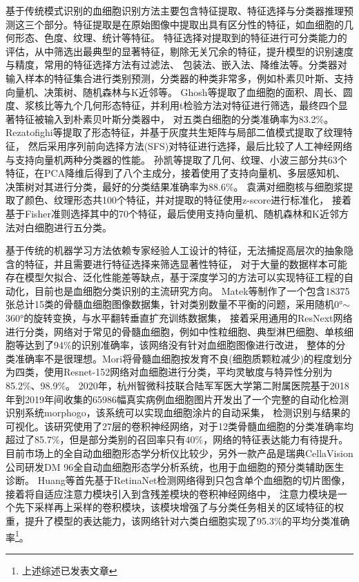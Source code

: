 基于传统模式识别\cite{jain2000statistical}的血细胞识别方法主要包含特征提取、特征选择与分类器推理预测这三个部分。特征提取是在原始图像中提取出具有区分性的特征，如血细胞的几何形态、色度、纹理、统计等特征。
特征选择对提取到的特征进行可分类能力的评估，从中筛选出最典型的显著特征，剔除无关冗余的特征，提升模型的识别速度与精度，常用的特征选择方法有过滤法、
包装法、嵌入法、降维法等。分类器对输入样本的特征集合进行类别预测，分类器的种类非常多，例如朴素贝叶斯、支持向量机、决策树、随机森林与K近邻等。
Ghosh\cite{ghosh2010statistical}等提取了血细胞的面积、周长、圆度、浆核比等九个几何形态特征，并利用t检验方法对特征进行筛选，最终四个显著特征被输入到朴素贝叶斯分类器中，
对五类白细胞的分类准确率为83.2\%。Rezatofighi\cite{2011Automatic}等提取了形态特征，并基于灰度共生矩阵与局部二值模式提取了纹理特征，
然后采用序列前向选择方法(SFS)对特征进行选择，最后比较了人工神经网络与支持向量机两种分类器的性能。
孙凯\cite{sunkai2020}等提取了几何、纹理、小波三部分共63个特征，在PCA降维后得到了八个主成分，接着使用了支持向量机、多层感知机、决策树对其进行分类，最好的分类结果准确率为88.6\%。
袁满\cite{yuan2017}对细胞核与细胞浆提取了颜色、纹理形态共100个特征，并对提取的特征使用z-score进行标准化，
接着基于Fisher准则选择其中的70个特征，最后使用支持向量机、随机森林和K近邻方法对白细胞进行五分类。

基于传统的机器学习方法依赖专家经验人工设计的特征，无法捕捉高层次的抽象隐含的特征，并且需要进行特征选择来筛选显著性特征，
对于大量的数据样本可能存在模型欠拟合、泛化性能差等缺点，基于深度学习的方法可以实现特征工程的自动化，目前也是血细胞分类识别的主流研究方向。
Matek\cite{matek2019human}等制作了一个包含18375张总计15类的骨髓血细胞图像数据集，针对类别数量不平衡的问题，采用随机0°$\sim$360°的旋转变换，与水平翻转垂直扩充训练数据集，
接着采用通用的ResNext网络进行分类，网络对于常见的骨髓血细胞，例如中性粒细胞、典型淋巴细胞、单核细胞等达到了94\%的识别准确率，该网络没有针对血细胞图像进行改进，
整体的分类准确率不是很理想。Mori\cite{mori2020assessment}将骨髓血细胞按发育不良(细胞质颗粒减少)的程度划分为四类，使用Resnet-152网络对血细胞进行分类，平均灵敏度与特异性分别为85.2\%、98.9\%。
2020年，杭州智微科技\cite{fu2020morphogo}联合陆军军医大学第二附属医院基于2018年到2019年间收集的65986幅真实病例血细胞图片开发出了一个完整的自动化检测识别系统morphogo，该系统可以实现血细胞涂片的自动采集，
检测识别与结果的可视化。该研究使用了27层的卷积神经网络，对于12类骨髓血细胞的分类准确率均超过了85.7\%，但是部分类别的召回率只有40\%，网络的特征表达能力有待提升。
目前市场上的全自动血细胞形态学分析仪比较少，另外一款产品是瑞典CellaVision公司研发DM 96\cite{yoon2019diagnostic}全自动血细胞形态学分析系统，也用于血细胞的预分类辅助医生诊断。
Huang\cite{huang2020attention}等首先基于RetinaNet检测网络得到只包含单个血细胞的切片图像，接着将自适应注意力模块引入到含残差模块的卷积神经网络中，
注意力模块是一个先下采样再上采样的卷积模块，该模块增强了与分类任务相关的区域特征的权重，提升了模型的表达能力，该网络针对六类白细胞实现了95.3\%的平均分类准确率\footnote[]{上述综述已发表文章\cite{SWGC202206005}}。

